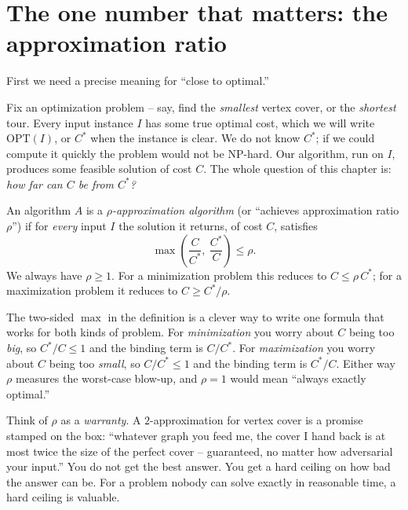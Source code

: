 \chapterline

\section{The one number that matters: the approximation ratio}

First we need a precise meaning for ``close to optimal.''

Fix an optimization problem -- say, find the \emph{smallest} vertex cover, or
the \emph{shortest} tour. Every input instance $I$ has some true optimal cost,
which we will write $\mathrm{OPT}(I)$, or $C^{*}$ when the instance is
clear. We do not know $C^{*}$; if we could compute it quickly the problem
would not be NP-hard. Our algorithm, run on $I$, produces some feasible
solution of cost $C$. The whole question of this chapter is: \emph{how far
can $C$ be from $C^{*}$?}

\begin{definition}
\label{ch34:def-ratio}
An algorithm $A$ is a \emph{$\rho$-approximation algorithm} (or
``achieves approximation ratio $\rho$'') if for \emph{every} input $I$ the
solution it returns, of cost $C$, satisfies
\[
\max\!\left(\frac{C}{C^{*}},\ \frac{C^{*}}{C}\right) \le \rho .
\]
We always have $\rho \ge 1$. For a minimization problem this reduces to
$C \le \rho\, C^{*}$; for a maximization problem it reduces to
$C \ge C^{*}/\rho$.
\end{definition}

The two-sided $\max$ in the definition is a clever way to write one
formula that works for both kinds of problem. For \emph{minimization} you
worry about $C$ being too \emph{big}, so $C^{*}/C \le 1$ and the binding
term is $C/C^{*}$. For \emph{maximization} you worry about $C$ being too
\emph{small}, so $C/C^{*} \le 1$ and the binding term is $C^{*}/C$. Either
way $\rho$ measures the worst-case blow-up, and $\rho = 1$ would mean
``always exactly optimal.''

\begin{intuitionbox}
Think of $\rho$ as a \emph{warranty}. A $2$-approximation for vertex cover
is a promise stamped on the box: ``whatever graph you feed me, the cover I
hand back is at most twice the size of the perfect cover -- guaranteed, no
matter how adversarial your input.'' You do not get the best answer. You get
a hard ceiling on how bad the answer can be. For a problem nobody can solve
exactly in reasonable time, a hard ceiling is valuable.
\end{intuitionbox}

